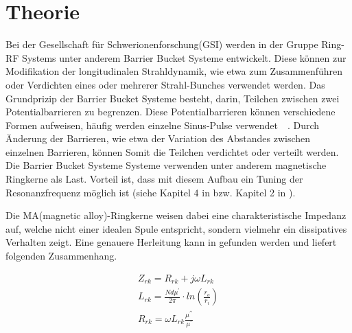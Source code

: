 \section{Theorie}

Bei der Gesellschaft für Schwerionenforschung(GSI) werden in der Gruppe Ring-RF Systems unter anderem  Barrier Bucket Systeme entwickelt. Diese können zur Modifikation der longitudinalen Strahldynamik, wie etwa zum Zusammenf\"uhren oder Verdichten eines oder mehrerer Strahl-Bunches verwendet werden. 
Das Grundprizip der Barrier Bucket Systeme besteht, darin, Teilchen zwischen zwei Potentialbarrieren zu begrenzen. Diese Potentialbarrieren k\"onnen verschiedene Formen aufweisen, h\"aufig werden einzelne Sinus-Pulse verwendet~\citep{harzheim2016modeling}~\citep{lee1997particle}. Durch \"Anderung der Barrieren, wie etwa der Variation des Abstandes zwischen einzelnen Barrieren, k\"onnen Somit die Teilchen verdichtet oder verteilt werden.
Die Barrier Bucket Systeme Systeme verwenden unter anderem magnetische Ringkerne als Last. Vorteil ist, dass mit diesem Aufbau ein Tuning der Resonanzfrequenz m\"oglich ist (siehe Kapitel 4 in \citep{Klingbeil2015} bzw. Kapitel 2 in \citep{bast2017ba}).
\par
Die MA(magnetic alloy)-Ringkerne weisen dabei eine charakteristische Impedanz auf, welche nicht einer idealen Spule entspricht, sondern vielmehr ein dissipatives Verhalten zeigt. Eine genauere Herleitung kann in \citep{Klingbeil2015} gefunden werden und liefert folgenden Zusammenhang. 


\begin{align}
Z_{rk} = R_{rk} + j\omega L_{rk}\label{eq_01}\\
L_{rk} = \frac{Nd\mu^\prime}{2\pi}\cdot ln(\frac{r_o}{r_i})\label{eq_02}\\
R_{rk} = \omega L_{rk} \frac{\mu^{\prime\prime}}{\mu^{\prime}}\label{eq_03}
\end{align}



